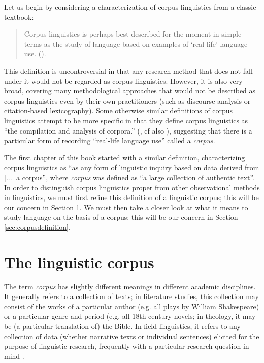 Let us begin by considering a characterization of corpus linguistics from a classic textbook:

\begin{quotation}
Corpus linguistics is perhaps best described for the moment in simple terms as the study of language based on examples of `real life' language use. (\citealt[1]{mcenery_corpus_2001}).
\end{quotation}

This definition is uncontroversial in that any research method that does not fall under it would not be regarded as corpus linguistics. However, it is also very broad, covering many methodological approaches that would not be described as corpus linguistics even by their own practitioners (such as discourse analysis or citation-based lexicography). Some otherwise similar definitions of corpus linguistics attempt to be more specific in that they define corpus linguistics as ``the compilation and analysis of corpora.'' (\citealt[6]{cheng_exploring_2012}, cf also \citealt[xi]{meyer_english_2002}), suggesting that there is a particular form of recording ``real-life language use'' called a \emph{corpus}. 

The first chapter of this book started with a similar definition, characterizing corpus linguistics as ``as any form of linguistic inquiry based on data derived from [...] a corpus'', where \emph{corpus} was defined as ``a large collection of authentic text''. In order to distinguish corpus linguistics proper from other observational methods in linguistics, we must first refine this definition of a linguistic corpus; this will be our concern in Section \ref{sec:linguisticcorpus}. We must then take a closer look at what it means to study language on the basis of a corpus; this will be our concern in Section \ref{sec:corpusdefinition}.

\section{The linguistic corpus}
\label{sec:linguisticcorpus}

The term \emph{corpus} has slightly different meanings in different academic disciplines. It generally refers to a collection of texts; in literature studies, this collection may consist of the works of a particular author (e.g. all plays by William Shakespeare) or a particular genre and period (e.g. all 18th century novels; in theology, it may be (a particular translation of) the Bible. In field linguistics, it refers to any collection of data (whether narrative texts or individual sentences) elicited for the purpose of linguistic research, frequently with a particular research question in mind \citep[cf.][769]{sebba_corpora_1994}.

